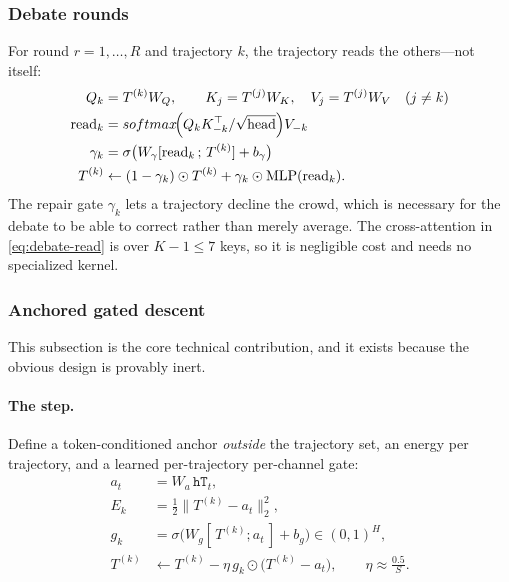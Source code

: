 \documentclass[11pt,a4paper]{article}
\newcommand{\etadim}{\eta}
\newcommand{\sm}{softmax}
\newcommand{\hd}{\mathrm{head}}
\theoremstyle{plain}
\theoremstyle{definition}
\theoremstyle{remark}
\begin{document}
\subsubsection{Debate rounds}

\noindent
For round $r = 1,\dots,R$ and trajectory $k$, the trajectory reads the
others---not itself:
\begin{align}
  Q_k &= T^{(k)} W_Q, \qquad K_j = T^{(j)} W_K, \quad V_j = T^{(j)} W_V \quad (j \neq k) \nonumber\\
  \mathrm{read}_k &= \sm\!\Bigl(Q_k K_{-k}^{\top} / \sqrt{\hd}\Bigr) V_{-k} \label{eq:debate-read}\\
  \gamma_k &= \sigma\bigl(W_\gamma [\mathrm{read}_k \,;\, T^{(k)}] + b_\gamma\bigr) \nonumber\\
  T^{(k)} &\leftarrow (1 - \gamma_k) \odot T^{(k)} + \gamma_k \odot \mathrm{MLP}(\mathrm{read}_k). \label{eq:debate-revise}
\end{align}
The repair gate $\gamma_k$ lets a trajectory decline the crowd, which is
necessary for the debate to be able to correct rather than merely average. The
cross-attention in \eqref{eq:debate-read} is over $K-1 \le 7$ keys, so it is
negligible cost and needs no specialized kernel.

\subsubsection{Anchored gated descent}

\noindent
This subsection is the core technical contribution, and it exists because the
obvious design is provably inert.

\paragraph{The step.}
Define a token-conditioned anchor \emph{outside} the trajectory set, an energy
per trajectory, and a learned per-trajectory per-channel gate:
\begin{align}
  a_t &= W_a\, \texttt{hT}_t, \label{eq:agd-anchor}\\
  E_k &= \tfrac{1}{2}\bigl\|T^{(k)} - a_t\bigr\|_2^2, \label{eq:agd-energy}\\
  g_k &= \sigma\bigl(W_g [\,T^{(k)}; a_t\,] + b_g\bigr) \in (0,1)^H, \label{eq:agd-gate}\\
  T^{(k)} &\leftarrow T^{(k)} - \etadim\, g_k \odot \bigl(T^{(k)} - a_t\bigr), \qquad \etadim \approx \tfrac{0.5}{S}. \label{eq:agd-step}
\end{align}
\end{document}
